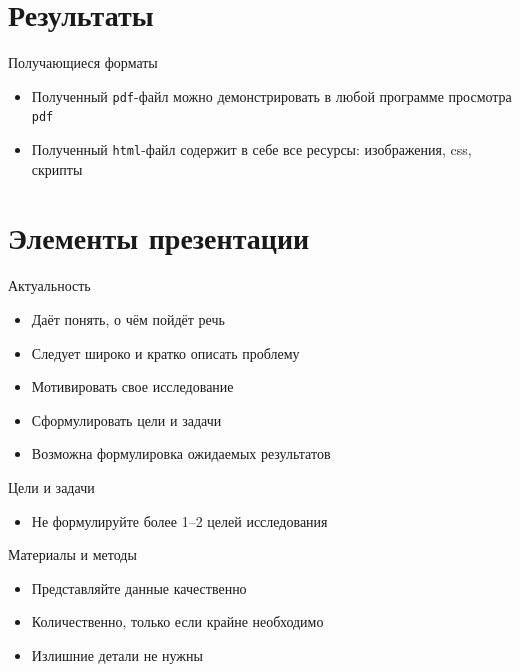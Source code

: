 \documentclass[
  ignorenonframetext,
  aspectratio=169,
]{beamer}
\providecommand{\tightlist}{%
  \setlength{\itemsep}{0pt}\setlength{\parskip}{0pt}}\usepackage{longtable,booktabs,array}
\begin{document}
\section{Результаты}\label{ux440ux435ux437ux443ux43bux44cux442ux430ux442ux44b}

\begin{frame}[fragile]{Получающиеся форматы}
\label{ux43fux43eux43bux443ux447ux430ux44eux449ux438ux435ux441ux44f-ux444ux43eux440ux43cux430ux442ux44b}
\begin{itemize}[<+->]
\tightlist
\item
  Полученный \texttt{pdf}-файл можно демонстрировать в любой программе
  просмотра \texttt{pdf}
\item
  Полученный \texttt{html}-файл содержит в себе все ресурсы:
  изображения, css, скрипты
\end{itemize}
\end{frame}

\section{Элементы
презентации}\label{ux44dux43bux435ux43cux435ux43dux442ux44b-ux43fux440ux435ux437ux435ux43dux442ux430ux446ux438ux438}

\begin{frame}{Актуальность}
\label{ux430ux43aux442ux443ux430ux43bux44cux43dux43eux441ux442ux44c}
\begin{itemize}[<+->]
\tightlist
\item
  Даёт понять, о чём пойдёт речь
\item
  Следует широко и кратко описать проблему
\item
  Мотивировать свое исследование
\item
  Сформулировать цели и задачи
\item
  Возможна формулировка ожидаемых результатов
\end{itemize}
\end{frame}

\begin{frame}{Цели и задачи}
\label{ux446ux435ux43bux438-ux438-ux437ux430ux434ux430ux447ux438-1}
\begin{itemize}[<+->]
\tightlist
\item
  Не формулируйте более 1--2 целей исследования
\end{itemize}
\end{frame}

\begin{frame}{Материалы и методы}
\label{ux43cux430ux442ux435ux440ux438ux430ux43bux44b-ux438-ux43cux435ux442ux43eux434ux44b-1}
\begin{itemize}[<+->]
\tightlist
\item
  Представляйте данные качественно
\item
  Количественно, только если крайне необходимо
\item
  Излишние детали не нужны
\end{itemize}
\end{frame}
\end{document}
